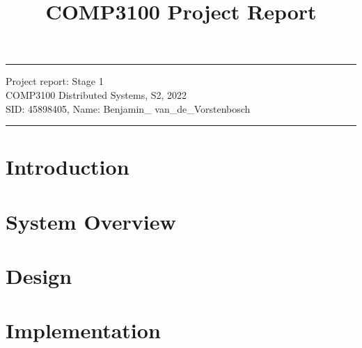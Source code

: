 \documentclass[a4paper]{article}
\begin{document}
\title{COMP3100 Project Report} %
\fancyhead[C]{}
\hrule \medskip %
\begin{minipage}{1\textwidth} %
\centering 
\large %
Project report: Stage 1\\ %
COMP3100 Distributed Systems, S2, 2022\\
\normalsize %
SID: 45898405, Name: Benjamin\_ van\_de\_Vorstenbosch
\end{minipage}
\medskip\hrule %
\bigskip

\section{Introduction}


\section{System Overview}


\newpage

\section{Design}


\newpage

\section{Implementation}


\newpage

\nocite{*}
\printbibliography[]

\end{document}
